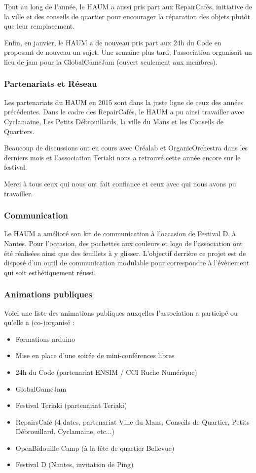 \documentclass[11pt]{article}
\begin{document}
Tout au long de l'année, le HAUM a aussi pris part aux RepairCafés, initiative de la ville et des conseils de quartier
pour encourager la réparation des objets plutôt que leur remplacement.

Enfin, en janvier, le HAUM a de nouveau pris part aux 24h du Code en proposant de nouveau un sujet. Une semaine plus
tard, l'association organisait un lieu de jam pour la GlobalGameJam (ouvert seulement aux membres).

\subsubsection{Partenariats et Réseau}

Les partenariats du HAUM en 2015 sont dans la juste ligne de ceux des années précédentes. Dans le cadre des
RepairCafés, le HAUM a pu ainsi travailler avec Cyclamaine, Les Petits Débrouillards, la ville du Mans
et les Conseils de Quartiers.

Beaucoup de discussions ont eu cours avec Créalab et OrganicOrchestra dans les derniers mois et l'association Teriaki
nous a retrouvé cette année encore sur le festival.

Merci à tous ceux qui nous ont fait confiance et ceux avec qui nous avons pu travailler.

\subsubsection{Communication}

Le HAUM a amélioré son kit de communication à l'occasion de Festival D, à Nantes. Pour l'occasion, des pochettes aux
couleurs et logo de l'association ont été réalisées ainsi que des feuillets à y glisser. L'objectif derrière ce projet
est de disposé d'un outil de communication modulable pour correspondre à l'évènement qui soit esthétiquement réussi.

\subsubsection{Animations publiques}

Voici une liste des animations publiques auxqelles l'association a participé ou qu'elle a (co-)organisé :

\begin{itemize}
    \item Formations arduino
    \item Mise en place d'une soirée de mini-conférences libres
    \item 24h du Code (partenariat ENSIM / CCI Ruche Numérique)
	\item GlobalGameJam
    \item Festival Teriaki (partenariat Teriaki)
	\item RepairsCafé (4 dates, partenariat Ville du Mans, Conseils de Quartier, Petits Débrouillard, Cyclamaine, etc...)
	\item OpenBidouille Camp (à la fête de quartier Bellevue)
	\item Festival D (Nantes, invitation de Ping)
\end{itemize}
\end{document}
